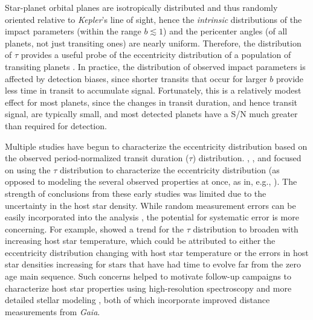 \documentclass{aastex62}
\newcommand{\ikt}{{\it Kepler}}
\newcommand{\gaiat}{{\it Gaia}}
\begin{document}
Star-planet orbital planes are isotropically distributed and thus randomly oriented relative to \ikt's line of sight, hence the \emph{intrinsic} distributions of the impact parameters (within the range $b \lesssim 1$) and the pericenter angles (of all planets, not just transiting ones) are nearly uniform.  
Therefore, the distribution of $\tau$ provides a useful probe of the eccentricity distribution of a population of transiting planets \citep{Ford:2008}.  
In practice, the distribution of observed impact parameters is affected by detection biases, since shorter transits that occur for larger $b$ provide less time in transit to accumulate signal.  
Fortunately, this is a relatively modest effect for most planets, since the changes in transit duration, and hence transit signal, are typically small, and most detected planets have a S/N much greater than required for detection.

Multiple studies have begun to characterize the eccentricity distribution based on the observed period-normalized transit duration ($\tau$) distribution.  \citet{Moorhead:2011}, \cite{Kane:2012}, \cite{Plavchan:2014} and \cite{Xie:2016} focused on using the $\tau$ distribution to characterize the eccentricity distribution (as opposed to modeling the several observed properties at once,  as in, e.g., \cite{Mulders:2018,He:2019,Sandford:2019,He:2020,Zhu:2018,MacDonald:2020,Yang:2020}).  
The strength of conclusions from these early studies was limited due to the uncertainty in the host star density.  While random measurement errors can be easily incorporated into the analysis \citep{Ford:2008}, the potential for systematic error is more concerning.  For example, \citet{Moorhead:2011} showed a trend for the $\tau$ distribution to broaden with increasing host star temperature, which could be attributed to either the eccentricity distribution changing with host star temperature or the errors in host star densities increasing for stars that have had time to evolve far from the zero age main sequence.  Such concerns helped to motivate follow-up campaigns to characterize host star properties using high-resolution spectroscopy \citep{Fulton:2018} and more detailed stellar modeling \citep{Berger:2020a}, both of which  incorporate improved distance measurements from \gaiat.
\end{document}
